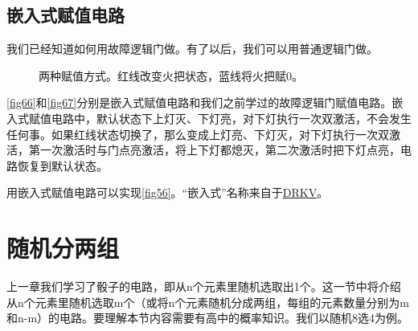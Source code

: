 \subsection{嵌入式赋值电路}\label{sec37}
我们已经知道如何用故障逻辑门做。有了以后，我们可以用普通逻辑门做。

\begin{figure}[!ht]
\centering
{}
\qquad
{}
\caption{两种赋值方式。红线改变火把状态，蓝线将火把赋0。}
\end{figure}

\autoref{fig66}和\autoref{fig67}分别是嵌入式赋值电路和我们之前学过的故障逻辑门赋值电路。嵌入式赋值电路中，默认状态下上灯灭、下灯亮，对下灯执行一次双激活，不会发生任何事。如果红线状态切换了，那么变成上灯亮、下灯灭，对下灯执行一次双激活，第一次激活时与门点亮激活，将上下灯都熄灭，第二次激活时把下灯点亮，电路恢复到默认状态。

用嵌入式赋值电路可以实现\autoref{fig56}。“嵌入式”名称来自于\href{https://forums.terraria.org/index.php?threads/a-reference-guide-for-simple-logic-devices.81751/}{DRKV}。

\section{随机分两组}\label{sec36}

上一章我们学习了骰子的电路，即从n个元素里随机选取出1个。这一节中将介绍从n个元素里随机选取m个（或将n个元素随机分成两组，每组的元素数量分别为m和n-m）的电路。要理解本节内容需要有高中的概率知识。我们以随机8选4为例。

